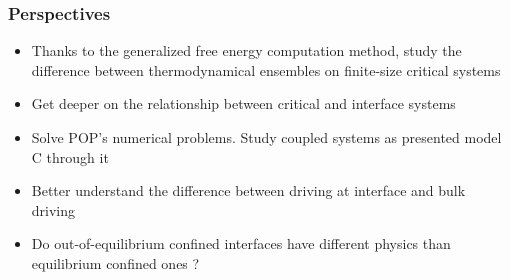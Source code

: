 \documentclass[9pt, dvipsnames,aspectratio=169]{beamer} %
\begin{document}
\begin{frame}
    \frametitle{Perspectives}
    \begin{itemize}
    	\item Thanks to the generalized free energy computation method, study the difference between thermodynamical ensembles on finite-size critical systems
    	\item Get deeper on the relationship between critical and interface systems
    	\item Solve POP's numerical problems. Study coupled systems as presented model C through it
    	\item Better understand the difference between driving at interface and bulk driving
    	\item Do out-of-equilibrium confined interfaces have different physics than equilibrium confined ones ?
    \end{itemize}
\end{frame}
\end{document}
